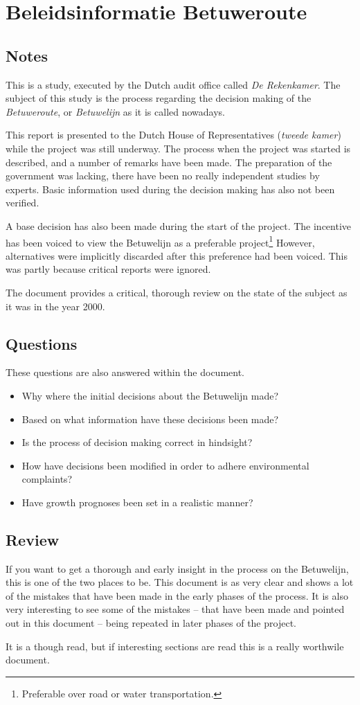 \chapter{Beleidsinformatie Betuweroute \cite{beleidsinformatie-betuweroute}}
\section{Notes}
This is a study, executed by the Dutch audit office called \emph{De Rekenkamer}. 
The subject of this study is the process regarding the decision making of the \emph{Betuweroute}, or \emph{Betuwelijn} as it is called nowadays. 

This report is presented to the Dutch House of Representatives (\emph{tweede kamer}) while the project was still underway. 
The process when the project was started is described, and a number of remarks have been made.
The preparation of the government was lacking, there have been no really independent studies by experts. 
Basic information used during the decision making has also not been verified. 

A base decision has also been made during the start of the project. 
The incentive has been voiced to view the Betuwelijn as a preferable project\footnote{Preferable over road or water transportation.} 
However, alternatives were implicitly discarded after this preference had been voiced. 
This was partly because critical reports were ignored.

The document provides a critical, thorough review on the state of the subject as it was in the year 2000.

\section{Questions}
These questions are also answered within the document.
\begin{itemize}
  \item Why where the initial decisions about the Betuwelijn made?
  \item Based on what information have these decisions been made?
  \item Is the process of decision making correct in hindsight?
  \item How have decisions been modified in order to adhere environmental complaints?
  \item Have growth prognoses been set in a realistic manner?
\end{itemize}

\section{Review}
If you want to get a thorough and early insight in the process on the Betuwelijn, this is one of the two places to be. 
This document is as very clear and shows a lot of the mistakes that have been made in the early phases of the process. 
It is also very interesting to see some of the mistakes -- that have been made and pointed out in this document -- being repeated in later phases of the project.

It is a though read, but if interesting sections are read this is a really worthwile document.
